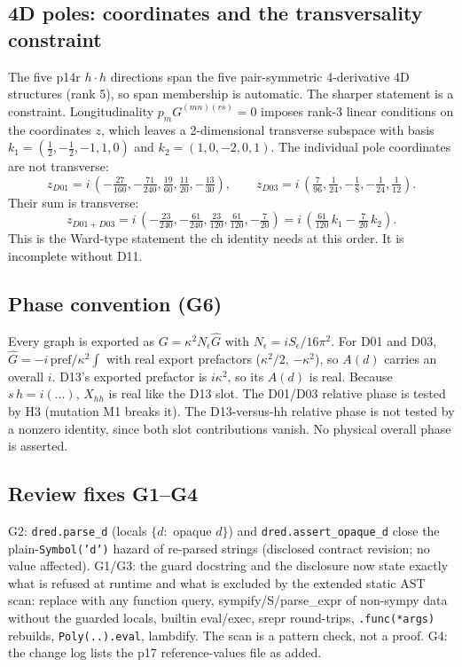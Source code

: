 \subsection{4D poles: coordinates and the transversality constraint}
The five p14r $h\cdot h$ directions span the five pair-symmetric 4-derivative 4D structures (rank 5), so span
membership is automatic. The sharper statement is a constraint. Longitudinality $p_mG^{(mn)(rs)}=0$ imposes rank-3
linear conditions on the coordinates $z$, which leaves a 2-dimensional transverse subspace with basis
$k_1=(\tfrac12,-\tfrac12,-1,1,0)$ and $k_2=(1,0,-2,0,1)$. The individual pole coordinates are not transverse:
\[
z_{D01}=i\,(-\tfrac{27}{160},-\tfrac{71}{240},\tfrac{19}{60},\tfrac{11}{20},-\tfrac{13}{30}),\qquad
z_{D03}=i\,(\tfrac{7}{96},\tfrac{1}{24},-\tfrac18,-\tfrac1{24},\tfrac1{12}).
\]
Their sum is transverse:
\[
z_{D01+D03}=i\,(-\tfrac{23}{240},-\tfrac{61}{240},\tfrac{23}{120},\tfrac{61}{120},-\tfrac{7}{20})
=i\,(\tfrac{61}{120}\,k_1-\tfrac{7}{20}\,k_2).
\]
This is the Ward-type statement the ch identity needs at this order. It is incomplete without D11.

\subsection{Phase convention (G6)}
Every graph is exported as $G=\kappa^2N_\epsilon\hat G$ with $N_\epsilon=iS_\epsilon/16\pi^2$. For D01 and D03,
$\hat G=-i\,\mathrm{pref}/\kappa^2\int$ with real export prefactors ($\kappa^2/2$, $-\kappa^2$), so $A(d)$ carries an
overall $i$. D13's exported prefactor is $i\kappa^2$, so its $A(d)$ is real. Because $s\,h=i(\dots)$, $X_{hh}$ is real
like the D13 slot. The D01/D03 relative phase is tested by H3 (mutation M1 breaks it). The D13-versus-hh relative
phase is not tested by a nonzero identity, since both slot contributions vanish. No physical overall phase is
asserted.

\subsection{Review fixes G1--G4}
G2: \texttt{dred.parse\_d} (locals $\{d:$ opaque $d\}$) and \texttt{dred.assert\_opaque\_d} close the plain-\texttt{Symbol('d')}
hazard of re-parsed strings (disclosed contract revision; no value affected). G1/G3: the guard docstring and the
disclosure now state exactly what is refused at runtime and what is excluded by the extended static AST scan:
replace with any function query, sympify/S/parse\_expr of non-sympy data without the guarded locals, builtin
eval/exec, srepr round-trips, \texttt{.func(*args)} rebuilds, \texttt{Poly(..).eval}, lambdify. The scan is a pattern
check, not a proof. G4: the change log lists the p17 reference-values file as added.

